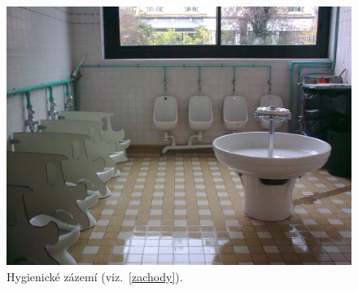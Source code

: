 	\begin{figure}[tb]
		\centering
		\includegraphics[height=0.35\textheight]{./fotky/Obr19.jpg}
		\caption{
			Hygienické zázemí (viz.~\ref{zachody}).
		}
		\label{Obr19}
	\end{figure}